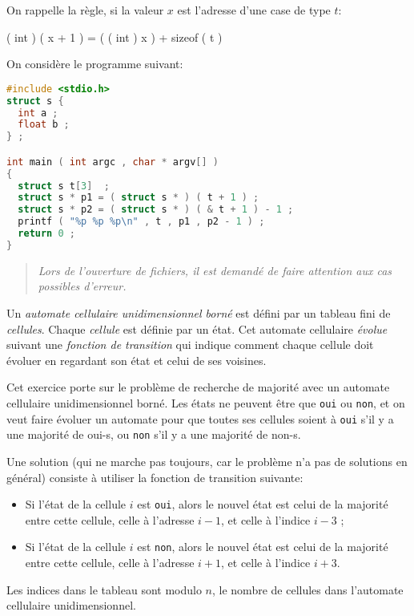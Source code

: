 

On rappelle la règle, si la valeur \(x\) est l'adresse d'une case de type \(t\):
\begin{center}
  ( int ) ( x + 1 ) = ( ( int ) x ) + sizeof ( t ) 
\end{center}


On considère le programme suivant:
\begin{lstlisting}[language=C]
#include <stdio.h>
struct s {
  int a ;
  float b ;
} ;

int main ( int argc , char * argv[] )
{
  struct s t[3]  ;
  struct s * p1 = ( struct s * ) ( t + 1 ) ;
  struct s * p2 = ( struct s * ) ( & t + 1 ) - 1 ;
  printf ( "%p %p %p\n" , t , p1 , p2 - 1 ) ;
  return 0 ;
}
\end{lstlisting}



\begin{quotation}
  \sl Lors de l'ouverture de fichiers, il est demandé de faire
  attention aux cas possibles d'erreur.
\end{quotation}

  Un \emph{automate cellulaire unidimensionnel born{\'e}} est
  d{\'e}fini par un tableau fini de \emph{cellules}. Chaque \emph{cellule}
  est d{\'e}finie par un {\'e}tat. Cet automate cellulaire \emph{{\'e}volue} suivant une
  \emph{fonction de transition} qui indique comment chaque cellule doit 
  {\'e}voluer en regardant son {\'e}tat et celui de ses voisines.

  Cet exercice porte sur le probl{\`e}me de recherche de majorit{\'e} avec un
  automate cellulaire unidimensionnel born{\'e}. Les {\'e}tats ne peuvent
  {\^e}tre que \texttt{oui} ou \texttt{non}, et on veut faire {\'e}voluer un
  automate pour que toutes ses cellules soient {\`a} \texttt{oui} s'il y a
  une majorit{\'e} de oui-s, ou \texttt{non} s'il y a une majorit{\'e} de non-s.

  Une solution (qui ne marche pas toujours, car le probl{\`e}me n'a pas de
  solutions en g{\'e}n{\'e}ral) consiste {\`a} utiliser la fonction de transition
  suivante:
  \begin{itemize}
  \item Si l'{\'e}tat de la cellule $i$ est \texttt{oui}, alors le nouvel 
  {\'e}tat est celui de la majorit{\'e} entre cette cellule, celle {\`a} 
  l'adresse $i-1$, et celle {\`a} l'indice $i-3$ ;
  \item Si l'{\'e}tat de la cellule $i$ est \texttt{non}, alors le nouvel 
  {\'e}tat est celui de la majorit{\'e} entre cette cellule, celle {\`a} 
  l'adresse $i+1$, et celle {\`a} l'indice $i+3$.
  \end{itemize}
  Les indices dans le tableau sont modulo $n$, le nombre de cellules 
  dans l'automate cellulaire unidimensionnel.

